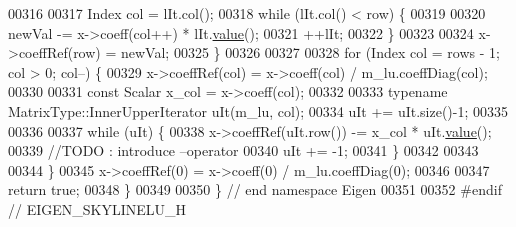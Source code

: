 \begin{DoxyCode}
00316 
00317         Index col = lIt.col();
00318         \textcolor{keywordflow}{while} (lIt.col() < row) \{
00319 
00320             newVal -= x->coeff(col++) * lIt.\hyperlink{group___core___module_a8da735a6bfc7012606acf787156d10a0}{value}();
00321             ++lIt;
00322         \}
00323 
00324         x->coeffRef(row) = newVal;
00325     \}
00326 
00327 
00328     \textcolor{keywordflow}{for} (Index col = rows - 1; col > 0; col--) \{
00329         x->coeffRef(col) = x->coeff(col) / m\_lu.coeffDiag(col);
00330 
00331         \textcolor{keyword}{const} Scalar x\_col = x->coeff(col);
00332 
00333         \textcolor{keyword}{typename} MatrixType::InnerUpperIterator uIt(m\_lu, col);
00334         uIt += uIt.size()-1;
00335 
00336 
00337         \textcolor{keywordflow}{while} (uIt) \{
00338             x->coeffRef(uIt.row()) -= x\_col * uIt.\hyperlink{group___core___module_a8da735a6bfc7012606acf787156d10a0}{value}();
00339             \textcolor{comment}{//TODO : introduce --operator}
00340             uIt += -1;
00341         \}
00342 
00343 
00344     \}
00345     x->coeffRef(0) = x->coeff(0) / m\_lu.coeffDiag(0);
00346 
00347     \textcolor{keywordflow}{return} \textcolor{keyword}{true};
00348 \}
00349 
00350 \} \textcolor{comment}{// end namespace Eigen}
00351 
00352 \textcolor{preprocessor}{#endif // EIGEN\_SKYLINELU\_H}
\end{DoxyCode}
